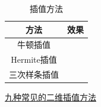 \documentclass{article}
\numberwithin{figure}{section}
\numberwithin{equation}{section}
\numberwithin{table}{section}
\begin{document}
\begin{table}[h!]
  \begin{center}
    \caption{插值方法}
    \begin{tabular}{cc} %
\toprule
方法 & 效果 \\
\midrule
牛顿插值 & \\
Hermite插值 & \\
三次样条插值 & \\
\bottomrule
    \end{tabular}
  \end{center}
\end{table}

\href{https://blog.csdn.net/yanfeng1022/article/details/114528323}{九种常见的二维插值方法}
\printbibliography
\end{document}
